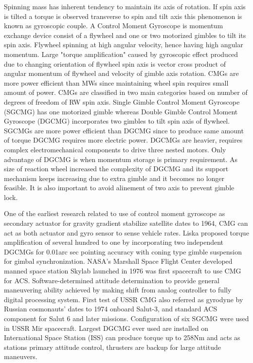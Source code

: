 Spinning mass has inherent tendency to maintain its axis of rotation. If spin axis is tilted a torque is observed transverse to spin and tilt axis this phenomenon is known as gyroscopic couple. A Control Moment Gyroscope is momentum exchange device consist of a flywheel and one or two motorized gimbles to tilt its spin axis. Flywheel spinning at high angular velocity, hence having high angular momentum. Large "torque amplification" caused by gyroscopic effect produced due to changing orientation of flywheel spin axis is vector cross product of angular momentum of flywheel and velocity of gimble axis rotation.\cite{Leve2015} CMGs are more power efficient than MWs since maintaining wheel spin requires small amount of power. CMGs are classified in two main categories based on number of degrees of freedom of RW spin axis. Single Gimble Control Moment Gyroscope (SGCMG) has one motorized gimble whereas Double Gimble Control Moment Gyroscope (DGCMG) incorporates two gimbles to tilt spin axis of flywheel. SGCMGs are more power efficient than DGCMG since to produce same amount of torque DGCMG requires more electric power. DGCMGs are heavier, requires complex electromechanical components to drive three nested motors. Only advantage of DGCMG is when momentum storage is primary requirement. As size of reaction wheel increased the complexity of DGCMG and its support mechanism keeps increasing due to extra gimble and it becomes no longer feasible. It is also important to avoid alinement of two axis to prevent gimble lock.\cite{ Markley2014} 

One of the earliest research related to use of control moment gyroscope as secondary actuator for gravity gradient stabilize satellite dates to 1964, CMG can act as both actuator and gyro sensor to sense vehicle rates.\cite{Scott1964} Liska proposed torque amplification of several hundred to one by incorporating two independent DGCMGs for 0.01arc sec pointing accuracy with coning type gimble suspension for gimbal synchronization. \cite{Liska1968}
NASA's Marshall Space Flight Center developed manned space station Skylab launched in 1976 was first spacecraft to use CMG for ACS.\cite{SELTZERSM} Software-determined attitude determination to provide general maneuvering ability achieved by making shift from analog controller to fully digital processing system. \cite{Coon1976} First test of USSR CMG also referred as gyrodyne by Russian cosmonauts’ dates to 1974 onboard Salut-3, and standard ACS component for Salut 6 and later missions. Configuration of six SGCMG were used in USSR Mir spacecraft. \cite{Branets1988} Largest DGCMG ever used are installed on International Space Station (ISS) can produce torque up to 258Nm and acts as stations primary attitude control, thrusters are backup for large attitude maneuvers.\cite{Gurrisi2010} 

